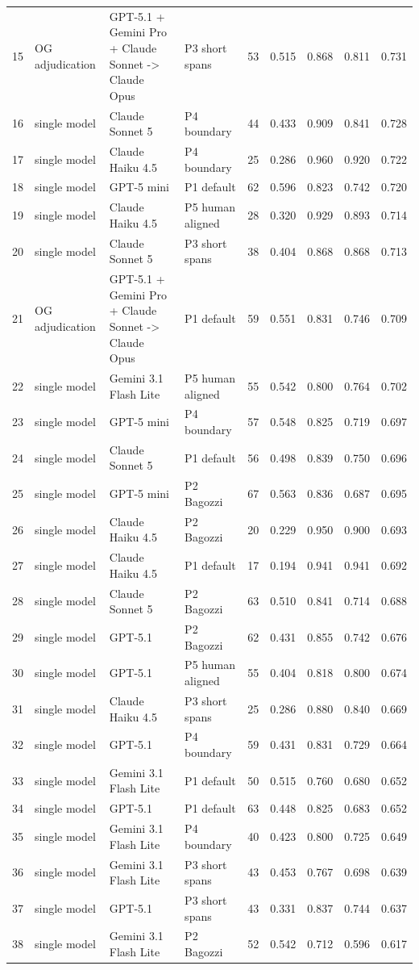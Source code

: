 \begin{table}[t]
\begin{tabular}{rlllrrrrr}
15 & OG adjudication & GPT-5.1 + Gemini Pro + Claude Sonnet -> Claude Opus & P3 short spans & 53 & 0.515 & 0.868 & 0.811 & 0.731 \\
16 & single model & Claude Sonnet 5 & P4 boundary & 44 & 0.433 & 0.909 & 0.841 & 0.728 \\
17 & single model & Claude Haiku 4.5 & P4 boundary & 25 & 0.286 & 0.960 & 0.920 & 0.722 \\
18 & single model & GPT-5 mini & P1 default & 62 & 0.596 & 0.823 & 0.742 & 0.720 \\
19 & single model & Claude Haiku 4.5 & P5 human aligned & 28 & 0.320 & 0.929 & 0.893 & 0.714 \\
20 & single model & Claude Sonnet 5 & P3 short spans & 38 & 0.404 & 0.868 & 0.868 & 0.713 \\
21 & OG adjudication & GPT-5.1 + Gemini Pro + Claude Sonnet -> Claude Opus & P1 default & 59 & 0.551 & 0.831 & 0.746 & 0.709 \\
22 & single model & Gemini 3.1 Flash Lite & P5 human aligned & 55 & 0.542 & 0.800 & 0.764 & 0.702 \\
23 & single model & GPT-5 mini & P4 boundary & 57 & 0.548 & 0.825 & 0.719 & 0.697 \\
24 & single model & Claude Sonnet 5 & P1 default & 56 & 0.498 & 0.839 & 0.750 & 0.696 \\
25 & single model & GPT-5 mini & P2 Bagozzi & 67 & 0.563 & 0.836 & 0.687 & 0.695 \\
26 & single model & Claude Haiku 4.5 & P2 Bagozzi & 20 & 0.229 & 0.950 & 0.900 & 0.693 \\
27 & single model & Claude Haiku 4.5 & P1 default & 17 & 0.194 & 0.941 & 0.941 & 0.692 \\
28 & single model & Claude Sonnet 5 & P2 Bagozzi & 63 & 0.510 & 0.841 & 0.714 & 0.688 \\
29 & single model & GPT-5.1 & P2 Bagozzi & 62 & 0.431 & 0.855 & 0.742 & 0.676 \\
30 & single model & GPT-5.1 & P5 human aligned & 55 & 0.404 & 0.818 & 0.800 & 0.674 \\
31 & single model & Claude Haiku 4.5 & P3 short spans & 25 & 0.286 & 0.880 & 0.840 & 0.669 \\
32 & single model & GPT-5.1 & P4 boundary & 59 & 0.431 & 0.831 & 0.729 & 0.664 \\
33 & single model & Gemini 3.1 Flash Lite & P1 default & 50 & 0.515 & 0.760 & 0.680 & 0.652 \\
34 & single model & GPT-5.1 & P1 default & 63 & 0.448 & 0.825 & 0.683 & 0.652 \\
35 & single model & Gemini 3.1 Flash Lite & P4 boundary & 40 & 0.423 & 0.800 & 0.725 & 0.649 \\
36 & single model & Gemini 3.1 Flash Lite & P3 short spans & 43 & 0.453 & 0.767 & 0.698 & 0.639 \\
37 & single model & GPT-5.1 & P3 short spans & 43 & 0.331 & 0.837 & 0.744 & 0.637 \\
38 & single model & Gemini 3.1 Flash Lite & P2 Bagozzi & 52 & 0.542 & 0.712 & 0.596 & 0.617 \\
\bottomrule
\end{tabular}
\end{table}
